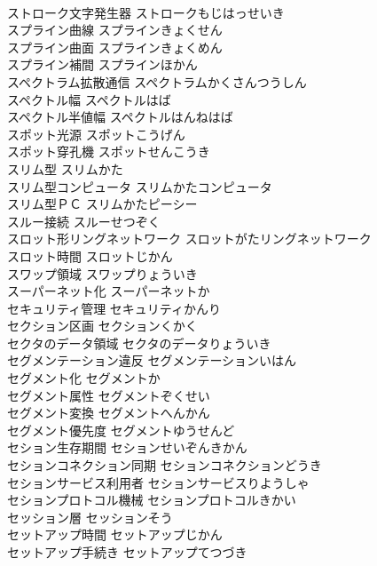 \documentclass[8pt]{extreport}
\begin{document}
\begin{CJK}{UTF8}{min}
\\	ストローク文字発生器	ストロークもじはっせいき	
\\	スプライン曲線	スプラインきょくせん	
\\	スプライン曲面	スプラインきょくめん	
\\	スプライン補間	スプラインほかん	
\\	スペクトラム拡散通信	スペクトラムかくさんつうしん	
\\	スペクトル幅	スペクトルはば	
\\	スペクトル半値幅	スペクトルはんねはば	
\\	スポット光源	スポットこうげん	
\\	スポット穿孔機	スポットせんこうき	
\\	スリム型	スリムかた	
\\	スリム型コンピュータ	スリムかたコンピュータ	
\\	スリム型ＰＣ	スリムかたピーシー	
\\	スルー接続	スルーせつぞく	
\\	スロット形リングネットワーク	スロットがたリングネットワーク	
\\	スロット時間	スロットじかん	
\\	スワップ領域	スワップりょういき	
\\	スーパーネット化	スーパーネットか	
\\	セキュリティ管理	セキュリティかんり	
\\	セクション区画	セクションくかく	
\\	セクタのデータ領域	セクタのデータりょういき	
\\	セグメンテーション違反	セグメンテーションいはん	
\\	セグメント化	セグメントか	
\\	セグメント属性	セグメントぞくせい	
\\	セグメント変換	セグメントへんかん	
\\	セグメント優先度	セグメントゆうせんど	
\\	セション生存期間	セションせいぞんきかん	
\\	セションコネクション同期	セションコネクションどうき	
\\	セションサービス利用者	セションサービスりようしゃ	
\\	セションプロトコル機械	セションプロトコルきかい	
\\	セッション層	セッションそう	
\\	セットアップ時間	セットアップじかん	
\\	セットアップ手続き	セットアップてつづき	

\end{CJK}
\end{document}
